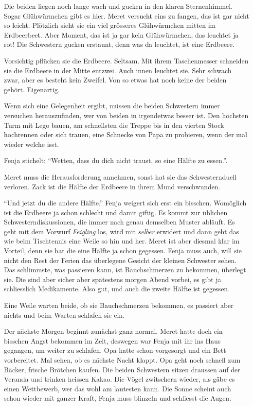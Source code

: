 Die beiden liegen noch lange wach und gucken in den klaren Sternenhimmel. Sogar Glühwürmchen gibt es hier. Meret versucht eins zu fangen, das ist gar nicht so leicht. Plötzlich sieht sie ein viel grösseres Glühwürmchen mitten im Erdbeerbeet. Aber Moment, das ist ja gar kein Glühwürmchen, das leuchtet ja rot! Die Schwestern gucken erstaunt, denn was da leuchtet, ist eine Erdbeere.

Vorsichtig pflücken sie die Erdbeere. Seltsam. Mit ihrem Taschenmesser schneiden sie die Erdbeere in der Mitte entzwei. Auch innen leuchtet sie. Sehr schwach zwar, aber es besteht kein Zweifel. Von so etwas hat noch keine der beiden gehört. Eigenartig. 

Wenn sich eine Gelegenheit ergibt, müssen die beiden Schwestern immer versuchen herauszufinden, wer von beiden in irgendetwas besser ist. Den höchsten Turm mit Lego bauen, am schnellsten die Treppe bis in den vierten Stock hochrennen oder sich trauen, eine Schnecke von Papa zu probieren, wenn der mal wieder welche isst. 

Fenja stichelt: \enquote{Wetten, dass du dich nicht traust, so eine Hälfte zu essen.}. 

Meret muss die Herausforderung annehmen, sonst hat sie das Schwesternduell verloren. Zack ist die Hälfte der Erdbeere in ihrem Mund verschwunden.

\enquote{Und jetzt du die andere Hälfte.} Fenja weigert sich erst ein bisschen. Womöglich ist die Erdbeere ja schon schlecht und damit giftig. Es kommt zur üblichen Schwesterndiskussionen, die immer nach genau demselben Muster abläuft. Es geht mit dem Vorwurf \textit{Feigling} los, wird mit \textit{selber} erwidert und dann geht das wie beim Tischtennis eine Weile so hin und her. Meret ist aber diesmal klar im Vorteil, denn sie hat die eine Hälfte ja schon gegessen. Fenja muss auch, will sie nicht den Rest der Ferien das überlegene Gesicht der kleinen Schwester sehen. Das schlimmste, was passieren kann, ist Bauchschmerzen zu bekommen, überlegt sie. Die sind aber sicher aber spätestens morgen Abend vorbei, es gibt ja schliesslich Medikamente. Also gut, und auch die zweite Hälfte ist gegessen.

Eine Weile warten beide, ob sie Bauchschmerzen bekommen, es passiert aber nichts und beim Warten schlafen sie ein.

\begin{center}
    {\color{DeepPink}\aldineleft}
\end{center}

Der nächste Morgen beginnt zunächst ganz normal. Meret hatte doch ein bisschen Angst bekommen im Zelt, deswegen war Fenja mit ihr ins Haus gegangen, um weiter zu schlafen. Opa hatte schon vorgesorgt und ein Bett vorbereitet. Mal sehen, ob es nächste Nacht klappt. Opa geht noch schnell zum Bäcker, frische Brötchen kaufen. Die beiden Schwestern sitzen draussen auf der Veranda und trinken heissen Kakao. Die Vögel zwitschern wieder, als gäbe es einen Wettbewerb, wer das wohl am lautesten kann. Die Sonne scheint auch schon wieder mit ganzer Kraft, Fenja muss blinzeln und schliesst die Augen.

